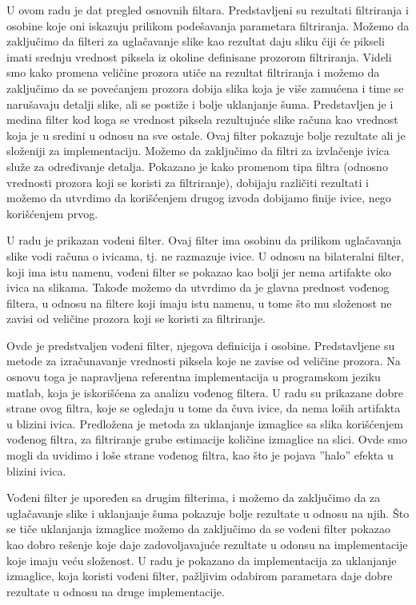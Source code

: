 \documentclass[a4paper,12pt,titlepage]{article}
\begin{document}
U ovom radu je dat pregled osnovnih filtara. Predstavljeni su rezultati filtriranja i osobine koje oni iskazuju prilikom podešavanja parametara filtriranja. Možemo da zaključimo da filteri za uglačavanje slike kao rezultat daju sliku čiji će pikseli imati srednju vrednost piksela iz okoline definisane prozorom filtriranja. Videli smo kako promena veličine prozora utiče na rezultat filtriranja i možemo da zaključimo da se povećanjem prozora dobija slika koja je više zamućena i time se narušavaju detalji slike, ali se postiže i bolje uklanjanje šuma. Predstavljen je i medina filter kod koga se vrednost piksela rezultujuće slike računa kao vrednost koja je u sredini u odnosu na sve ostale. Ovaj filter pokazuje bolje rezultate ali je složeniji za implementaciju. Možemo da zaključimo da filtri za izvlačenje ivica služe za određivanje detalja. Pokazano je kako promenom tipa filtra (odnosno vrednosti prozora koji se koristi za filtriranje), dobijaju različiti rezultati i možemo da utvrdimo da korišćenjem drugog izvoda dobijamo finije ivice, nego korišćenjem prvog.

U radu je prikazan vođeni filter. Ovaj filter ima osobinu da prilikom uglačavanja slike vodi računa o ivicama, tj. ne razmazuje ivice. U odnosu na bilateralni filter, koji ima istu namenu, vođeni filter se pokazao kao bolji jer nema artifakte oko ivica na slikama. Takođe možemo da utvrdimo da je glavna prednost vođenog filtera, u odnosu na filtere koji imaju istu namenu, u tome što mu složenost ne zavisi od veličine prozora koji se koristi za filtriranje.   

Ovde je predstvaljen vođeni filter, njegova definicija i osobine. Predstavljene su metode za izračunavanje vrednosti piksela koje ne zavise od veličine prozora. Na osnovu toga je napravljena referentna implementacija u programskom jeziku matlab, koja je iskorišćena za analizu vođenog filtera. U radu su prikazane dobre strane ovog filtra, koje se ogledaju u tome da čuva ivice, da nema loših artifakta u blizini ivica. Predložena je metoda za uklanjanje izmaglice sa slika korišćenjem vođenog filtra, za filtriranje grube estimacije količine izmaglice na slici. Ovde smo mogli da uvidimo i loše strane vođenog filtra, kao što je pojava ''halo'' efekta u blizini ivica. 

Vođeni filter je upoređen sa drugim filterima, i možemo da zaključimo da za uglačavanje slike i uklanjanje šuma pokazuje bolje rezultate u odnosu na njih. Što se tiče uklanjanja izmaglice možemo da zaključimo da se vođeni filter pokazao kao dobro rešenje koje daje zadovoljavajuće rezultate u odonsu na implementacije koje imaju veću složenost. U radu je pokazano da implementacija za uklanjanje izmaglice, koja koristi vođeni filter, pažljivim odabirom parametara daje dobre rezultate u odnosu na druge implementacije.
\end{document}

